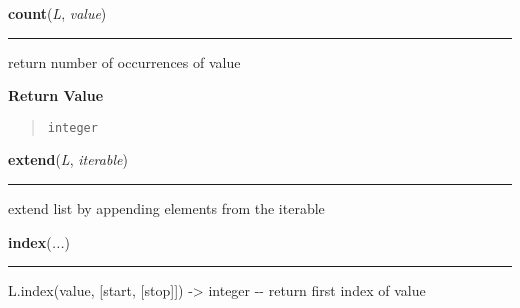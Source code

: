     \begin{boxedminipage}{\textwidth}

    \raggedright \textbf{count}(\textit{L}, \textit{value})

    \vspace{-1.5ex}

    \rule{\textwidth}{0.5\fboxrule}

return number of occurrences of value
    \vspace{1ex}

      \textbf{Return Value}
      \begin{quote}
\begin{alltt}
integer
\end{alltt}

      \end{quote}

    \vspace{1ex}

    \end{boxedminipage}

    \label{list:extend}

    \vspace{0.5ex}

    \begin{boxedminipage}{\textwidth}

    \raggedright \textbf{extend}(\textit{L}, \textit{iterable})

    \vspace{-1.5ex}

    \rule{\textwidth}{0.5\fboxrule}

extend list by appending elements from the iterable
    \vspace{1ex}

    \end{boxedminipage}

    \label{list:index}

    \vspace{0.5ex}

    \begin{boxedminipage}{\textwidth}

    \raggedright \textbf{index}(\textit{...})

    \vspace{-1.5ex}

    \rule{\textwidth}{0.5\fboxrule}

L.index(value, {[}start, {[}stop{]}{]}) -{\textgreater} integer -{}- return first index of value
    \vspace{1ex}

    \end{boxedminipage}


